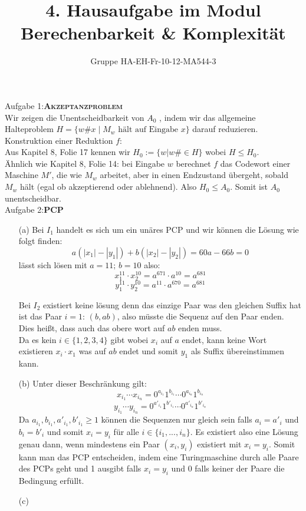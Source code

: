 \documentclass[a4paper,onecolumn,oneside,12pt,ngerman]{article}
\date{}
\title{4. Hausaufgabe im Modul \\ \glqq Berechenbarkeit \& Komplexität\grqq} %
\author{Gruppe HA-EH-Fr-10-12-MA544-3} %
\theoremstyle{plain} %
\theoremstyle{definition} %
\theoremstyle{remark} %
\theoremstyle{plain}
\begin{document}

\maketitle
\newpage
Aufgabe 1:\quad \textsc{\textbf{Akzeptanzproblem}}
\vspace{20pt}\\
Wir zeigen die Unentscheidbarkeit von  $A_0$ , indem wir das allgemeine Halteproblem  $H = \{ w\#x \mid M_w \text{ hält auf Eingabe } x \}$  darauf reduzieren.
\\Konstruktion einer Reduktion $f$:\\
Aus Kapitel 8, Folie 17 kennen wir $H_0 := \{w\vert w\# \in H\}$ wobei $H\leq H_0$.\\
Ähnlich wie Kapitel 8, Folie 14: bei Eingabe $w$ berechnet $f$ das Codewort einer Maschine $M'$, die wie $M_w$ arbeitet, 
aber in einen Endzustand übergeht, sobald $M_w$ hält (egal ob akzeptierend oder ablehnend).
Also $H_0\leq A_0$. Somit ist $A_0$ unentscheidbar.
\vspace{30pt}\\
Aufgabe 2:\quad \textsc{\textbf{PCP}}\\

\begin{enumerate}
  \item[(a)] 
Bei $I_1$ handelt es sich um ein unäres PCP und wir können die Lösung wie folgt finden:
$$a(|x_1|-|y_1|) + b(|x_2|-|y_2|) = 60a - 66b = 0$$
lässt sich lösen mit $a=11;\, b=10$ also: 
$$x_1^{11}\cdot x_2^{10} = a^{671}\cdot a^{10} = a^{681}$$
$$y_1^{11}\cdot y_2^{10} = a^{11}\cdot a^{670} = a^{681}$$

Bei $I_2$ existiert keine lösung denn das einzige Paar was den gleichen Suffix hat ist das Paar $i=1:\,(b,ab)$, also müsste die Sequenz auf den Paar enden.\\
Dies heißt, dass auch das obere wort auf $ab$ enden muss.\\
Da es kein $i\in\{1,2,3,4\}$ gibt wobei $x_i$ auf $a$ endet, kann keine Wort existieren $x_i\cdot x_1$ was auf $ab$ endet und somit $y_1$ als Suffix übereinstimmen kann.
  \item[(b)] Unter dieser Beschränkung gilt: 
  $$x_{i_1} \cdots x_{i_n} = 0^{a_{i_1}}1^{b_{i_1}}\cdots 0^{a_{i_n}}1^{b_{i_n}}$$
  $$y_{i_1} \cdots y_{i_n} = 0^{a'_{i_1}}1^{b'_{i_1}}\cdots 0^{a'_{i_n}}1^{b'_{i_n}}$$
  Da $a_{i_1},b_{i_1},a'_{i_1},b'_{i_1}\geq 1$ können die Sequenzen nur gleich sein falls $a_i = a'_i$ und $b_i = b'_i$ und somit $x_i = y_i$ für alle $i\in \{i_1,...,i_n\}$.
  Es existiert also eine Lösung genau dann, wenn mindestens ein Paar $(x_i, y_i)$ existiert mit $x_i = y_i$. Somit kann man das PCP entscheiden, indem eine Turingmaschine durch
  alle Paare des PCPs geht und 1 ausgibt falls $x_i=y_i$ und 0 falls keiner der Paare die Bedingung erfüllt.
  \item[(c)]
\end{enumerate}
\end{document}
